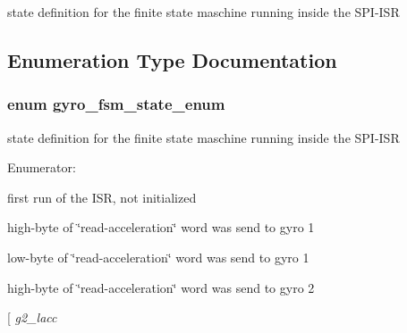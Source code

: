 state definition for the finite state maschine running inside the SPI-ISR 

\subsection{Enumeration Type Documentation}
\subsubsection{\setlength{\rightskip}{0pt plus 5cm}enum {\bf gyro\_\-fsm\_\-state\_\-enum}}\label{group__ro__spi_g5a3108ec978dba9260f83fcb22b9869d}


state definition for the finite state maschine running inside the SPI-ISR \begin{Desc}
\item[Enumerator: ]\par
\begin{description}
\item[{\em 
first\_\-run\label{group__ro__spi_gg5a3108ec978dba9260f83fcb22b9869daa7048a2453728fa3d27bbffe627e2c9}
}]first run of the ISR, not initialized \item[{\em 
g1\_\-hacc\label{group__ro__spi_gg5a3108ec978dba9260f83fcb22b9869db5aa52663e58641a93d1ccc2ab439bae}
}]high-byte of \char`\"{}read-acceleration\char`\"{} word was send to gyro 1 \item[{\em 
g1\_\-lacc\label{group__ro__spi_gg5a3108ec978dba9260f83fcb22b9869d02fb9bcf6fa7553d51a9d384547dd223}
}]low-byte of \char`\"{}read-acceleration\char`\"{} word was send to gyro 1 \item[{\em 
g2\_\-hacc\label{group__ro__spi_gg5a3108ec978dba9260f83fcb22b9869deae54b4c6a1a6f6ce88a4260ccf6a863}
}]high-byte of \char`\"{}read-acceleration\char`\"{} word was send to gyro 2 \item[{\em 
g2\_\-lacc\label{group__ro__spi_gg5a3108ec978dba9260f83fcb22b9869d068ed2d591f7973cc4b068fbef1197a5}
}
\end{description}
\end{Desc}
